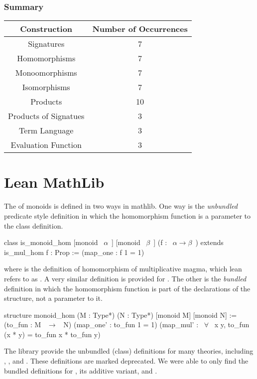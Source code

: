 \subsubsection*{Summary}
\begin{center}
\begin{tabular}{| c || c |}
\hline 
\textbf{Construction} & \textbf{Number of Occurrences} \\ \hline 
Signatures & 7 \\ \hline
Homomorphisms & 7  \\ \hline
Monoomorphisms & 7 \\ \hline
Isomorphisms & 7 \\ \hline
Products & 10 \\ \hline
Products of Signatues & 3 \\ \hline
Term Language & 3 \\ \hline
Evaluation Function & 3 \\ \hline
\end{tabular}
\end{center}

\section{Lean MathLib}
The \href{https://github.com/leanprover-community/mathlib/blob/4bb8d4475f897c8997100d31fe84b33050444374/src/algebra/group/hom.lean}
{} 
of monoids is defined in two ways in mathlib. 
One way is the \emph{unbundled} predicate style definition in which the homomorphism function is a parameter to the class definition.  
\begin{leancode} 
class is_monoid_hom [monoid ~$\alpha$~] [monoid ~$\beta$~] (f : ~$\alpha \to \beta$~) 
   extends is_mul_hom f : Prop :=
    (map_one : f 1 = 1)
\end{leancode} 
\noindent where  is the definition of homomorphism of multiplicative magma, which lean refers to as . A very similar definition is provided for . 
The other is the \emph{bundled} definition in which the homomorphism function is part of the declarations of the structure, not a parameter to it. 
\begin{leancode}     
structure monoid_hom (M : Type*) (N : Type*) [monoid M] [monoid N] :=
  (to_fun : M ~$\to$~ N)
  (map_one' : to_fun 1 = 1)
  (map_mul' : ~$\forall$~ x y, to_fun (x * y) = to_fun x * to_fun y)    
\end{leancode} 
The library provide the unbundled (class) definitions for many theories, including , , and . These definitions are marked deprecated. We were able to only find the bundled definitions for 
\href{https://github.com/leanprover-community/mathlib/blob/4bb8d4475f897c8997100d31fe84b33050444374/src/algebra/group/hom.lean}
{}, its additive variant, and 
\href{https://github.com/leanprover-community/mathlib/blob/4bb8d4475f897c8997100d31fe84b33050444374/src/algebra/ring.lean}
{}. 

